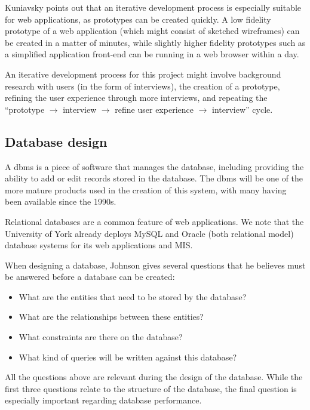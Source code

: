 \documentclass[]{scrartcl}
\begin{document}
Kuniavsky points out that an iterative development process is especially
suitable for web applications, as prototypes can be created quickly. A low
fidelity prototype of a web application (which might consist of sketched
wireframes) can be created in a matter of minutes, while slightly higher
fidelity prototypes such as a simplified application front-end can be running
in a web browser within a day.

An iterative development process for this project might involve background
research with users (in the form of interviews), the creation of a prototype,
refining the user experience through more interviews, and repeating the
``prototype $\rightarrow$ interview $\rightarrow$ refine user experience
$\rightarrow$ interview'' cycle.

\subsection{Database design}

A \gls{dbms} is a piece of software that manages the
database, including providing the ability to add or edit records stored in the
database. The \gls{dbms} will be one of the more mature products used in the
creation of this system, with many having been available since the 1990s.

Relational databases are a common feature of web applications. We note
that the University of York already deploys MySQL and Oracle (both relational
model) database systems for its web applications and MIS.

When designing a database, Johnson \cite{DatabaseModelsLanguagesDesign} gives
several questions that he believes must be answered before a database can be
created:

\begin{itemize}
  \item What are the entities that need to be stored by the database?
  \item What are the relationships between these entities?
  \item What constraints are there on the database?
  \item What kind of queries will be written against this database?
\end{itemize}

All the questions above are relevant during the design of the database. While
the first three questions relate to the structure of the database, the final
question is especially important regarding database performance.
\end{document}
